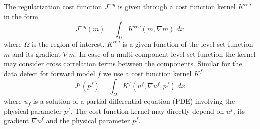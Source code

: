 The regularization cost function $J^{reg}$ is given through a cost function
kernel $K^{reg}$ in the form
\begin{equation}\label{REF:EQU:INTRO 2a}
J^{reg}(m) = \int_{\Omega} K^{reg}(m, \nabla m) \; dx
\end{equation} 
where $\Omega$ is the region of interest. $K^{reg}$ is a given function of the
level set function $m$ and its gradient $\nabla m$.
In case of a multi-component level set function the kernel may consider cross
correlation terms between the components.
Similar for the data defect for forward model $f$ we use a cost function kernel $K^{f}$ 
\begin{equation}\label{REF:EQU:INTRO 2b}
J^{f}(p^f) = \int_{\Omega} K^{f}(u^f, \nabla u^f,p^f) \; dx
\end{equation} 
where $u_f$ is a solution of a partial differential equation (PDE) involving
the physical parameter $p^f$.
The cost function kernel may directly depend on $u^f$, its gradient
$\nabla u^f$ and the physical parameter $p^f$.





 
